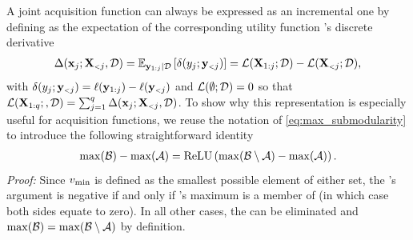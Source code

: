 A joint acquisition function \Acq{} can always be expressed as an incremental one by defining \iAcq{} as the expectation of the corresponding utility function \acq's discrete derivative%
\begin{align}
\Gain(\NEW{0}{\x}; \OLD{0}{\X}, \data)
  =
    \E_{\BOTH{0}{\Y}|\data}
    \left[
      \gain(\NEW{0}{\y}; \OLD{0}{\Y})
    \right]
  = 
    \Acq(\BOTH{0}{\X}; \data) - \Acq(\OLD{0}{\X}; \data),
\label{eq:growth_expected}
\end{align}
with \(\gain(\NEW{1}{\y}; \OLD{0}{\Y}) = \acq(\BOTH{0}{\Y}) - \acq(\OLD{1}{\Y})\) and \(\mathcal{L}(\emptyset; \mathcal{D}) = 0\) so that \(\Acq(\X_{1:q}; , \data) = \sum_{\roundIdx=1}^{\parallelism}\Gain(\NEW{1}{\x}; \OLD{1}{\X}, \data)\). To show why this representation is especially useful for \MM{} acquisition functions, we reuse the notation of \eqref{eq:max_submodularity} to introduce the following straightforward identity
\begin{align}
\max(\mathcal{B}) - \max(\mathcal{A}) = \operatorname{ReLU}\left(\max(\mathcal{B} \setminus \mathcal{A}) - \max(\mathcal{A})\right).
\label{eq:max_growth}
\end{align}
\emph{Proof:} Since \(v_{\min}\) is defined as the smallest possible element of either set, the \relu's argument is negative if and only if \setB's maximum is a member of \setA{} (in which case both sides equate to zero). In all other cases, the \relu{} can be eliminated and \(\max(\mathcal{B}) = \max(\mathcal{B} \setminus \mathcal{A})\) by definition.

